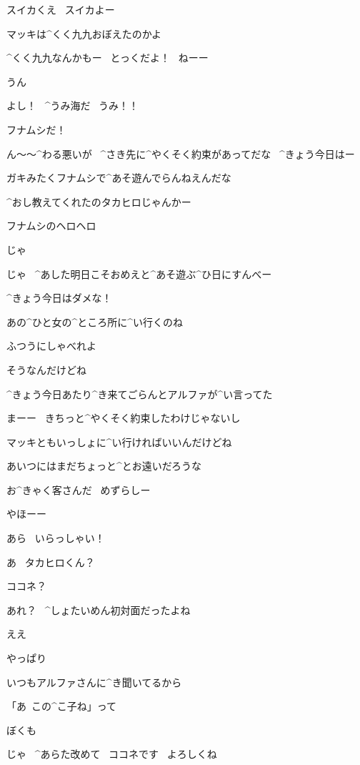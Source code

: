 \Person スイカくえ
\ スイカよー

\Takahiro マッキは^{くく}{九九}おぼえたのかよ

\Makki ^{くく}{九九}なんかもー
\ とっくだよ！
\ ねーー

\Person うん

\page
\Makki よし！
\ ^{うみ}{海}だ
\ うみ！！

\Makki フナムシだ！

\Takahiro ん〜〜^{わる}{悪}いが
\ ^{さき}{先}に^{やくそく}{約束}があってだな
\ ^{きょう}{今日}はー

\Takahiro ガキみたくフナムシで^{あそ}{遊}んでらんねえんだな

\Makki ^{おし}{教}えてくれたのタカヒロじゃんかー

\Makki フナムシのヘロヘロ

\page
\Takahiro じゃ

\Takahiro じゃ
\ ^{あした}{明日}こそおめえと^{あそ}{遊}ぶ^{ひ}{日}にすんべー

\Takahiro ^{きょう}{今日}はダメな！

\Makki あの^{ひと}{女}の^{ところ}{所}に^{い}{行}くのね

\Takahiro ふつうにしゃべれよ

\Takahiro そうなんだけどね

\page
\Takahiro ^{きょう}{今日}あたり^{き}{来}てごらんとアルファが^{い}{言}ってた

\Takahiro まーー
\ きちっと^{やくそく}{約束}したわけじゃないし

\Takahiro マッキともいっしょに^{い}{行}ければいいんだけどね

\Takahiro あいつにはまだちょっと^{とお}{遠}いだろうな

\page
\Takahiro お^{きゃく}{客}さんだ
\ めずらしー

\Takahiro やほーー

\page
\Alpha あら
\ いらっしゃい！

\Kokone あ
\ タカヒロくん？

\page
\Takahiro ココネ？

\Alpha あれ？
\ ^{しょたいめん}{初対面}だったよね

\Kokone ええ

\Kokone やっぱり

\Kokone いつもアルファさんに^{き}{聞}いてるから

\Kokone 「あ\ この^{こ}{子}ね」って

\Takahiro ぼくも

\page
\Kokone じゃ
\ ^{あらた}{改}めて
\ ココネです
\ よろしくね

